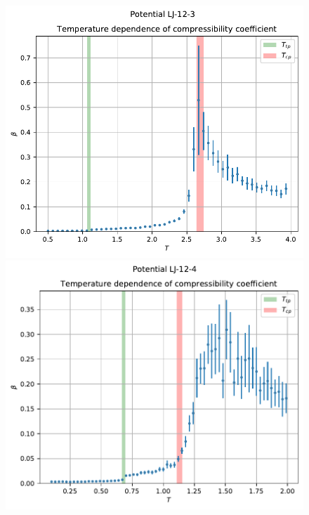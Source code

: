 \documentclass[pdf,hyperref={unicode}]{beamer}
\begin{document}
\begin{frame}
\transdissolve[duration=0.2]

\begin{figure}[h]
\begin{center}
\begin{minipage}[h]{0.35\linewidth}
\includegraphics[width=\textwidth, keepaspectratio]{plot_compress_Potential LJ-12-3_1}
\end{minipage}
\begin{minipage}[h]{0.35\linewidth}
\includegraphics[width=\textwidth, keepaspectratio]{plot_compress_Potential LJ-12-4_1}
\end{minipage}


\end{center}
\end{figure}
\end{frame}
\end{document}
